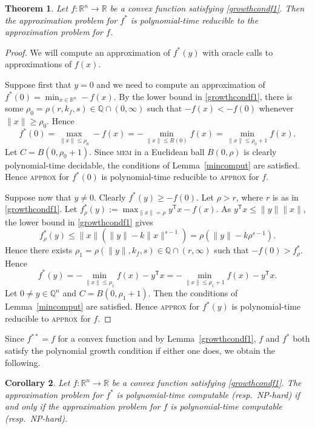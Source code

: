 \documentclass[11pt,reqno]{amsart}
\newtheorem{theorem}{Theorem}[section]
\newtheorem{corollary}[theorem]{Corollary}
\theoremstyle{definition}
\theoremstyle{remark}
\begin{document}
\begin{theorem}\label{compcpmplexf}
Let  $f:\mathbb{R}^n\to  \mathbb{R}$ be a convex function satisfying  
\eqref{growthcondf1}.  Then the approximation problem for $f^*$ is polynomial-time reducible to the approximation problem for $f$.
\end{theorem}
\begin{proof}
We will compute an approximation of $f^*(y)$ with oracle calls to approximations of $f(x)$.

Suppose first that $y=0$ and we need to compute an approximation of $f^*(0)=\min_{x\in\mathbb{R}^n} -f(x)$.  By the lower bound in \eqref{growthcondf1}, there is some $\rho_0=\rho(r, k_f,s)\in \mathbb{Q}\cap(0,\infty)$ such that $-f(x)<-f(0)$ whenever $\|x\|\ge \rho_0$.   Hence 
\[
f^*(0)=\max_{\|x\|\le \rho_0}-f(x)=-\min_{\|x\|\le R(0)} f(x)=\min_{\|x\|\le \rho_0+1} f(x).
\]
Let $C=B(0,\rho_0+1)$. Since \textsc{mem} in a Euclidean ball $B(0,\rho)$ is clearly polynomial-time decidable, the conditions of Lemma~\ref{mincomput} are satisfied.  Hence \textsc{approx} for $f^*(0)$ is polynomial-time reducible to \textsc{approx} for $f$.

Suppose now that $y\ne 0$.  Clearly $f^*(y)\ge -f(0)$.  Let $\rho>r$, where $r$ is as in \eqref{growthcondf1}.  Let $f^*_\rho(y):=\max_{\|x\|=\rho} y^\mathsf{T}x -f(x)$.
As $y^\mathsf{T}x\le \|y\| \|x\|$, the lower bound in \eqref{growthcondf1} gives
\[
f^*_{\rho}(y)\le \|x\|(\|y\|-k\|x\|^{s-1})= \rho(\|y\|-k\rho^{s-1}).
\]
Hence there exists $\rho_1  = \rho(\|y\|,k_f,s)\in \mathbb{Q}\cap (r,\infty)$ such that $-f(0)> f^*_{\rho}$.  Hence
\[f^*(y)=-\min_{\|x\|\le \rho_1} f(x)-y^\mathsf{T}x=-\min_{\|x\|\le \rho_1+1} f(x)-y^\mathsf{T}x.\]
Let $0 \ne y\in \mathbb{Q}^n$ and $C=B(0,\rho_1+1)$.  Then the conditions of Lemma~\ref{mincomput} are satisfied.  Hence \textsc{approx} for $f^*(y)$ is polynomial-time reducible to \textsc{approx} for $f$.
\end{proof}

Since $f^{**} = f$ for a convex function and by Lemma~\ref{growthcondf1}, $f$ and $f^*$ both satisfy the polynomial growth condition if either one does, we obtain the following.
\begin{corollary}
Let  $f:\mathbb{R}^n\to  \mathbb{R}$ be a convex function satisfying  
\eqref{growthcondf1}.  The approximation problem for $f^*$ is polynomial-time computable (resp.\ NP-hard) if and only if the approximation problem for $f$ is polynomial-time computable (resp.\ NP-hard).
\end{corollary}
\end{document}
